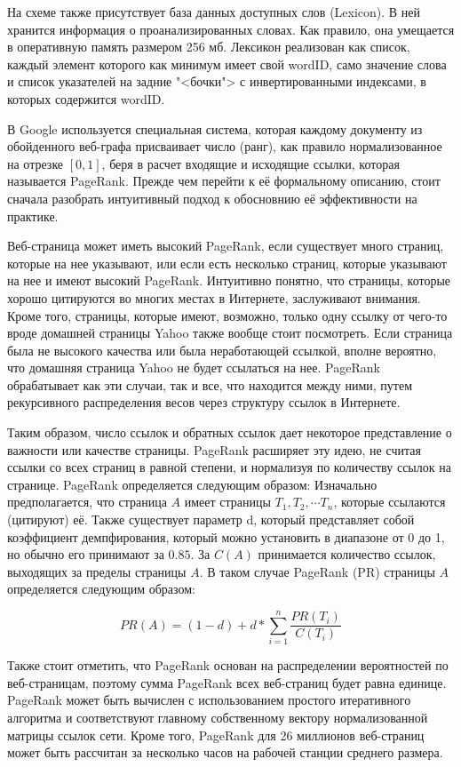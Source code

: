 На схеме также присутствует база данных доступных слов (Lexicon). В ней хранится информация о проанализированных словах. Как правило, она умещается в оперативную память размером 256 мб. Лексикон реализован как список, каждый элемент которого как минимум имеет свой wordID, само значение слова и список указателей на задние "<бочки"> с инвертированными индексами, в которых содержится wordID.

В Google используется специальная система, которая каждому документу из обойденного веб-графа присваивает число (ранг), как правило нормализованное на отрезке $[0, 1]$, беря в расчет входящие и исходящие ссылки, которая называется PageRank. Прежде чем перейти к её формальному описанию, стоит сначала разобрать интуитивный подход к обосновнию её эффективности на практике. 

Веб-страница может иметь высокий PageRank, если существует много страниц, которые на нее указывают, или если есть несколько страниц, которые указывают на нее и имеют высокий PageRank. Интуитивно понятно, что страницы, которые хорошо цитируются во многих местах в Интернете, заслуживают внимания. Кроме того, страницы, которые имеют, возможно, только одну ссылку от чего-то вроде домашней страницы Yahoo  также вообще стоит посмотреть. Если страница была не высокого качества или была неработающей ссылкой, вполне вероятно, что домашняя страница Yahoo не будет ссылаться на нее. PageRank обрабатывает как эти случаи, так и все, что находится между ними, путем рекурсивного распределения весов через структуру ссылок в Интернете.

Таким образом, число ссылок и обратных ссылок дает некоторое представление о важности или качестве страницы. PageRank расширяет эту идею, не считая ссылки со всех страниц в равной степени, и нормализуя по количеству ссылок на странице. PageRank определяется следующим образом:
Изначально предполагается, что страница $A$ имеет страницы $T_1, T_2, \cdots T_n$, которые ссылаются (цитируют) её. Также существует параметр d, который представляет собой коэффициент демпфирования, который можно установить в диапазоне от 0 до 1, но обычно его принимают за $0.85$. За $C(A)$ принимается количество ссылок, выходящих за пределы страницы $A$. В таком случае PageRank (PR) страницы $A$ определяется следующим образом:

\begin{equation}
PR(A) = (1 - d) + d * \sum_{i = 1}^{n}\frac{PR(T_i)}{C(T_i)}
\end{equation}

Также стоит отметить, что PageRank основан на распределении вероятностей по веб-страницам, поэтому сумма PageRank всех веб-страниц будет равна единице. PageRank может быть вычислен с использованием простого итеративного алгоритма и соответствуют главному собственному вектору нормализованной матрицы ссылок сети. Кроме того, PageRank для 26 миллионов веб-страниц может быть рассчитан за несколько часов на рабочей станции среднего размера. 

